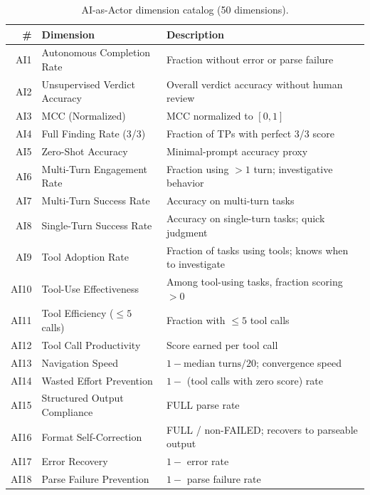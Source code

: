 \documentclass[10pt,twocolumn]{article}
\begin{document}
\begin{table}[t]
\centering
\caption{AI-as-Actor dimension catalog (50 dimensions).}
\label{tab:ai_actor_dims}
\small
\begin{tabular}{@{}r l p{7.5cm}@{}}
\toprule
\textbf{\#} & \textbf{Dimension} & \textbf{Description} \\
\midrule
AI1  & Autonomous Completion Rate          & Fraction without error or parse failure \\
AI2  & Unsupervised Verdict Accuracy       & Overall verdict accuracy without human review \\
AI3  & MCC (Normalized)                    & MCC normalized to $[0,1]$ \\
AI4  & Full Finding Rate (3/3)             & Fraction of TPs with perfect 3/3 score \\
AI5  & Zero-Shot Accuracy                  & Minimal-prompt accuracy proxy \\
AI6  & Multi-Turn Engagement Rate          & Fraction using ${>}1$ turn; investigative behavior \\
AI7  & Multi-Turn Success Rate             & Accuracy on multi-turn tasks \\
AI8  & Single-Turn Success Rate            & Accuracy on single-turn tasks; quick judgment \\
AI9  & Tool Adoption Rate                  & Fraction of tasks using tools; knows when to investigate \\
AI10 & Tool-Use Effectiveness              & Among tool-using tasks, fraction scoring ${>}0$ \\
AI11 & Tool Efficiency (${\leq}5$ calls)   & Fraction with ${\leq}5$ tool calls \\
AI12 & Tool Call Productivity              & Score earned per tool call \\
AI13 & Navigation Speed                    & $1 - \text{median turns} / 20$; convergence speed \\
AI14 & Wasted Effort Prevention            & $1 -$ (tool calls with zero score) rate \\
AI15 & Structured Output Compliance        & FULL parse rate \\
AI16 & Format Self-Correction              & FULL / non-FAILED; recovers to parseable output \\
AI17 & Error Recovery                      & $1 -$ error rate \\
AI18 & Parse Failure Prevention            & $1 -$ parse failure rate \\

\end{tabular}
\end{table}
\end{document}

